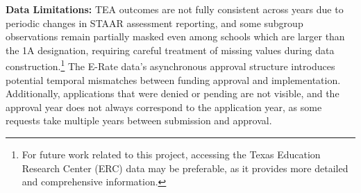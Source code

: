 \textbf{Data Limitations:} TEA outcomes are not fully consistent across years due to periodic changes in STAAR assessment reporting, and some subgroup observations remain partially masked even among schools which are larger than the 1A designation, requiring careful treatment of missing values during data construction.\footnote{For future work related to this project, accessing the Texas Education Research Center (ERC) data may be preferable, as it provides more detailed and comprehensive information.} The E-Rate data’s asynchronous approval structure introduces potential temporal mismatches between funding approval and implementation. Additionally, applications that were denied or pending are not visible, and the approval year does not always correspond to the application year, as some requests take multiple years between submission and approval.







